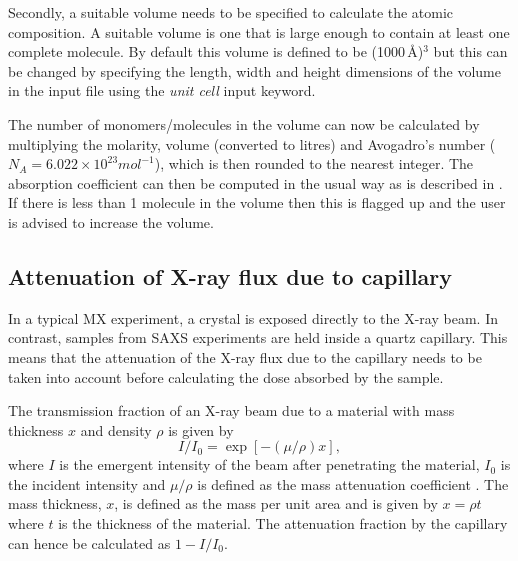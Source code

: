 Secondly, a suitable volume needs to be specified to calculate the atomic composition.
A suitable volume is one that is large enough to contain at least one complete molecule.
By default this volume is defined to be (1000$\,$\AA)$^\text{3}$ but this can be changed by specifying the length, width and height dimensions of the volume in the input file using the \textit{unit cell} input keyword.

The number of monomers/molecules in the volume can now be calculated by multiplying the molarity, volume (converted to litres) and Avogadro's number ($N_A = 6.022 \times 10^{23} mol^{-1}$), which is then rounded to the nearest integer.
The absorption coefficient can then be computed in the usual way as is described in \cite{pait2009}.
If there is less than 1 molecule in the volume then this is flagged up and the user is advised to increase the volume.

\subsection{Attenuation of X-ray flux due to capillary}
\label{sub:Attenuation of X-ray flux due to capillary}
In a typical MX experiment, a crystal is exposed directly to the X-ray beam.
In contrast, samples from SAXS experiments are held inside a quartz capillary.
This means that the attenuation of the X-ray flux due to the capillary needs to be taken into account before calculating the dose absorbed by the sample.

The transmission fraction of an X-ray beam due to a material with mass thickness $x$ and density $\rho$ is given by
\begin{equation}
    I/I_0 = \exp \left[ -(\mu/\rho)x\right],
    \label{eq:capillary transmission fraction}
\end{equation}
where $I$ is the emergent intensity of the beam after penetrating the material, $I_0$ is the incident intensity and $\mu/\rho$ is defined as the mass attenuation coefficient \cite{hubbell1995tables}.
The mass thickness, $x$, is defined as the mass per unit area and is given by $x = \rho t$ where $t$ is the thickness of the material.
The attenuation fraction by the capillary can hence be calculated as $1 - I/I_0$.


